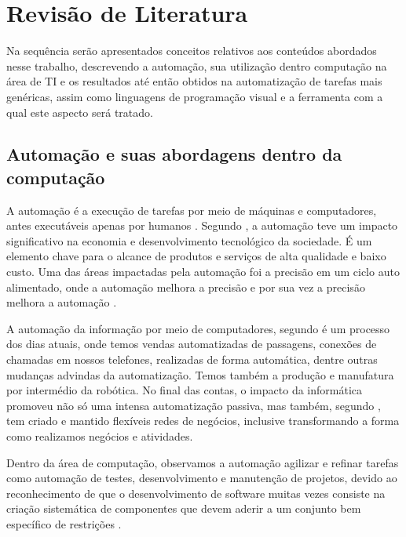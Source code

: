 \documentclass[12pt]{article}
\begin{document}
	\section{Revisão de Literatura}
	Na sequência serão apresentados conceitos relativos aos conteúdos abordados nesse trabalho, descrevendo a automação, sua utilização dentro computação na área de TI e os resultados até então obtidos na automatização de tarefas mais genéricas, assim como linguagens de programação visual e a ferramenta com a qual este aspecto será tratado.
	
      

	\subsection{Automação e suas abordagens dentro da computação}
	
	A automação é a execução de tarefas por meio de máquinas e computadores, antes executáveis apenas por humanos \cite{automationlevels}.	Segundo \citeauthor{automation2009} \cite[pág. 124]{automation2009}, a automação teve um impacto significativo na economia e desenvolvimento tecnológico da sociedade. É um elemento chave para o alcance de produtos e serviços de alta qualidade e baixo custo. Uma das áreas impactadas pela automação foi a precisão em um ciclo auto alimentado, onde a automação melhora a precisão e por sua vez a precisão melhora a automação \cite{auto2008precision}.
	
	A automação da informação por meio de computadores, segundo \citeauthor{automation2009} \cite[pág. 3]{automation2009} é  um processo dos dias atuais, onde temos vendas automatizadas de passagens, conexões de chamadas em nossos telefones, realizadas de forma automática, dentre outras mudanças advindas da automatização. Temos também a produção e manufatura por intermédio da robótica. No final das contas, o impacto da informática promoveu não só uma intensa automatização passiva, mas também, segundo \citeauthor{itEnabledBusiness}\cite{itEnabledBusiness}, tem criado e mantido flexíveis redes de negócios, inclusive transformando a forma como realizamos negócios e atividades.
	
	Dentro da área de computação, observamos a automação agilizar e refinar tarefas como automação de testes, desenvolvimento e manutenção de projetos, devido ao reconhecimento de que o desenvolvimento de software muitas vezes consiste na criação sistemática de componentes que devem aderir a um conjunto bem específico de restrições \cite{automionSoftEvolutionEffect}.
	
\end{document}

